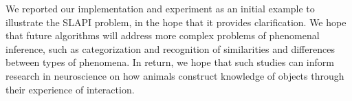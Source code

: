\documentclass[pmlr]{jmlr}%
\begin{document}
We reported our implementation and experiment as an initial example to illustrate the SLAPI problem, in the hope that it provides clarification. 
We hope that future algorithms will address more complex problems of phenomenal inference, such as categorization and recognition of similarities and differences between types of phenomena. 
In return, we hope that such studies can inform research in neuroscience on how animals construct knowledge of objects through their experience of interaction.


\end{document}
